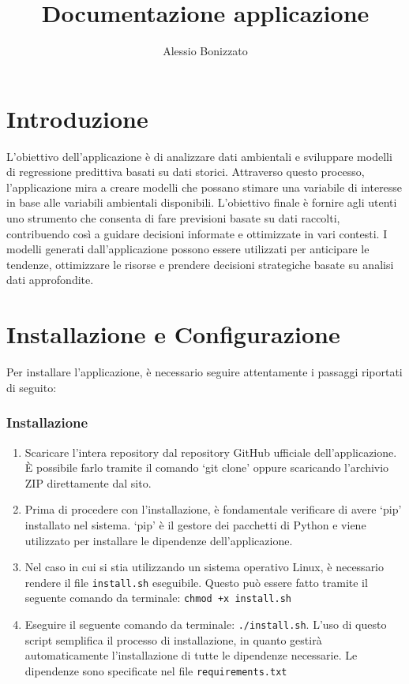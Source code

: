 \documentclass[a4paper,10pt]{article}
\begin{document}
\title{Documentazione applicazione}
\author{Alessio Bonizzato}
\date{}
\maketitle %

\newpage

\section{Introduzione}
L'obiettivo dell'applicazione è di analizzare dati ambientali e sviluppare modelli di regressione predittiva basati su dati storici. 
Attraverso questo processo, l'applicazione mira a creare modelli che possano stimare una variabile di interesse in base alle variabili ambientali disponibili. 
L'obiettivo finale è fornire agli utenti uno strumento che consenta di fare previsioni basate su dati raccolti, contribuendo così a guidare decisioni informate 
e ottimizzate in vari contesti. I modelli generati dall'applicazione possono essere utilizzati per anticipare le tendenze, 
ottimizzare le risorse e prendere decisioni strategiche basate su analisi dati approfondite.

\section{Installazione e Configurazione}
Per installare l'applicazione, è necessario seguire attentamente i passaggi riportati di seguito:

\subsubsection*{Installazione}
\begin{enumerate}
  \item Scaricare l'intera repository dal repository GitHub ufficiale dell'applicazione. 
  È possibile farlo tramite il comando `git clone' oppure scaricando l'archivio ZIP direttamente dal sito.
  \item Prima di procedere con l'installazione, è fondamentale verificare di avere `pip' installato nel sistema. 
  `pip' è il gestore dei pacchetti di Python e viene utilizzato per installare le dipendenze dell'applicazione.
  \item Nel caso in cui si stia utilizzando un sistema operativo Linux, è necessario rendere il file \texttt{install.sh} eseguibile. 
  Questo può essere fatto tramite il seguente comando da terminale: \texttt{chmod +x install.sh}
  \item Eseguire il seguente comando da terminale: \texttt{./install.sh}. L'uso di questo script semplifica il processo di installazione, 
  in quanto gestirà automaticamente l'installazione di tutte le dipendenze necessarie. Le dipendenze sono specificate nel file \texttt{requirements.txt}
\end{enumerate}
\end{document}
